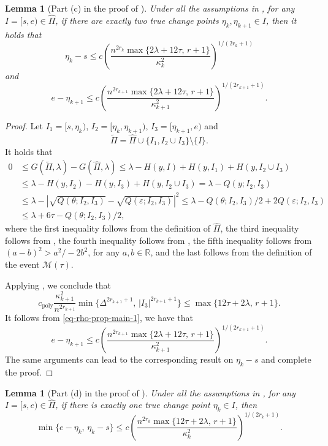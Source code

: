 \documentclass{article}
\newtheorem{lemma}[theorem]{Lemma}
\begin{document}
\begin{lemma}[Part (c) in the proof of ]\label{lem-exactly-two}
Under all the assumptions in , for any $I = [s, e) \in \widehat{\Pi}$, if there are exactly two true change points $\eta_k, \eta_{k+1} \in I$, then it holds that
	\[
		\eta_k - s \leq c\left(\frac{n^{2r_k}\max\{2\lambda + 12\tau, \, r + 1\}}{\kappa_k^2}\right)^{1/(2r_k + 1)}
	\]
	and
	\[
		e - \eta_{k+1} \leq c\left(\frac{n^{2r_{k+1}}\max\{2\lambda + 12\tau, \, r + 1\}}{\kappa_{k+1}^2}\right)^{1/(2r_{k+1} + 1)}.
	\]
\end{lemma}

\begin{proof}
Let $I_1 = [s, \eta_k)$, $I_2 = [\eta_k, \eta_{k+1})$, $I_3 = [\eta_{k+1}, e)$ and
	\[
		\widetilde{\Pi} = \widehat{\Pi} \cup \{I_1, I_2 \cup I_3\} \setminus \{I\}.
	\]
	It holds that
	\begin{align*}
		0 & \leq G(\widetilde{\Pi}, \lambda) - G(\widehat{\Pi}, \lambda) \leq \lambda - H(y, I) + H(y, I_1) + H(y, I_2 \cup I_3) \\
		& \leq \lambda - H(y, I_2) - H(y, I_3) + H(y, I_2 \cup I_3) = \lambda - Q(y; I_2, I_3)  \\
		& \leq \lambda - |\sqrt{Q(\theta; I_2, I_3)} - \sqrt{Q(\varepsilon; I_2, I_3)}|^2 \leq \lambda - Q(\theta; I_2, I_3)/2 + 2 Q(\varepsilon; I_2, I_3) \\
		& \leq \lambda + 6\tau - Q(\theta; I_2, I_3)/2,
	\end{align*}
	where the first inequality follows from the definition of $\widehat{\Pi}$, the third inequality follows from , the fourth inequality follows from , the fifth inequality follows from $(a-b)^2 > a^2/ - 2b^2$, for any $a, b \in \mathbb{R}$, and the last follows from the definition of the event $\mathcal{M}(\tau)$.
	
Applying , we conclude that 
	\[
		c_{\mathrm{poly}} \frac{\kappa_{k + 1}^2}{n^{2r_{k + 1}}} \min\{\Delta^{2r_{k + 1} + 1}, \, |I_3|^{2r_{k + 1} + 1}\}\leq \max\{12\tau + 2\lambda, \, r + 1\}.
	\]
	It follows from \eqref{eq-rho-prop-main-1}, we have that
	\[
		e - \eta_{k+1} \leq c\left(\frac{n^{2r_{k+1}}\max\{2\lambda + 12\tau, \, r + 1\}}{\kappa_{k+1}^2}\right)^{1/(2r_{k+1} + 1)}.
	\]
	The same arguments can lead to the corresponding result on $\eta_k - s$ and complete the proof.
\end{proof}

\begin{lemma}[Part (d) in the proof of ]\label{lem-case-c}
Under all the assumptions in , for any $I = [s, e) \in \widehat{\Pi}$, if there is exactly one true change point $\eta_k \in I$, then
	\[
		\min\{e - \eta_k, \, \eta_k - s\} \leq c\left(\frac{n^{2r_k}\max\{12\tau + 2\lambda, \, r + 1\}}{\kappa_k^2}\right)^{1/(2r_k + 1)}.
	\]
\end{lemma}
\end{document}
